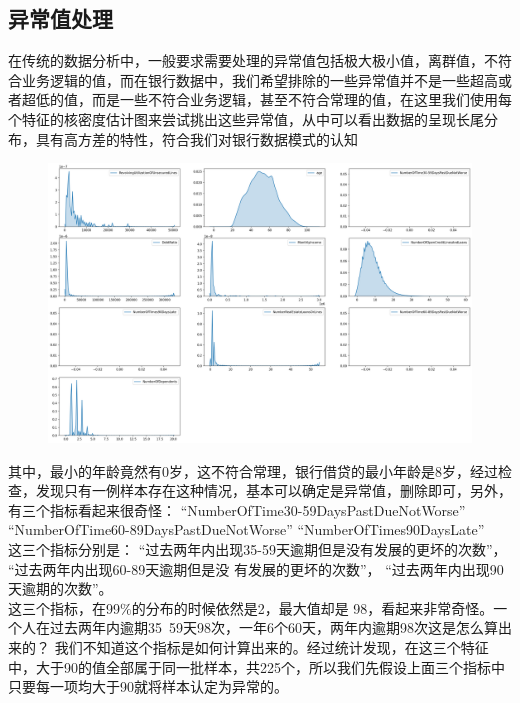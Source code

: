 \documentclass[12pt]{article}
\begin{document}
\newpage
\subsection{异常值处理}
\begin{flushleft}
	\noindent\qquad 在传统的数据分析中，一般要求需要处理的异常值包括极大极小值，离群值，不符合业务逻辑的值，而在银行数据中，我们希望排除的一些异常值并不是一些超高或者超低的值，而是一些不符合业务逻辑，甚至不符合常理的值，在这里我们使用每个特征的核密度估计图来尝试挑出这些异常值，从中可以看出数据的呈现长尾分布，具有高方差的特性，符合我们对银行数据模式的认知
\end{flushleft}
\begin{figure}[H]
	\centering
	\includegraphics[width=0.7\linewidth]{figures/20201025213636236}
	\caption{}
\end{figure}

\begin{flushleft}
	\noindent\qquad 其中，最小的年龄竟然有0岁，这不符合常理，银行借贷的最小年龄是8岁，经过检查，发现只有一例样本存在这种情况，基本可以确定是异常值，删除即可，另外，有三个指标看起来很奇怪：
	“NumberOfTime30-59DaysPastDueNotWorse”  “NumberOfTime60-89DaysPastDueNotWorse” “NumberOfTimes90DaysLate”\\
		\noindent\qquad 这三个指标分别是：
	“过去两年内出现35-59天逾期但是没有发展的更坏的次数”，
	“过去两年内出现60-89天逾期但是没 有发展的更坏的次数”，
	“过去两年内出现90天逾期的次数”。\\
		\noindent\qquad 这三个指标，在99$\%$的分布的时候依然是2，最大值却是 98，看起来非常奇怪。一个人在过去两年内逾期35~59天98次，一年6个60天，两年内逾期98次这是怎么算出来的？ 我们不知道这个指标是如何计算出来的。经过统计发现，在这三个特征中，大于90的值全部属于同一批样本，共225个，所以我们先假设上面三个指标中只要每一项均大于90就将样本认定为异常的。
\end{flushleft}

\newpage
\end{document}
